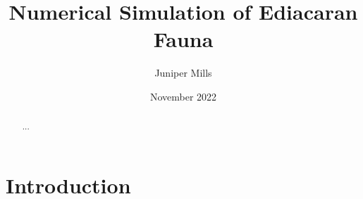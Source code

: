 \documentclass[draft]{article}
\begin{document}
    \title{Numerical Simulation of Ediacaran Fauna}
    \author{Juniper Mills}
    \date{November 2022}
    \maketitle
    \begin{abstract}
        ...
    \end{abstract}
    \tableofcontents
    \section{Introduction}
    \begin{thebibliography}{100}
        
    \end{thebibliography}
\end{document}

